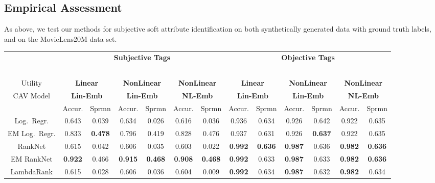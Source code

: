 \documentclass[manuscript,screen,nonacm]{acmart}
\newcommand{\1}{{\mathbf 1}}
\theoremstyle{TheoremNum}
\begin{document}
\subsection{Empirical Assessment}
\label{sec:empiricalSubjective}

As above, we test our methods for subjective soft attribute identification on both synthetically generated data with ground truth labels, and on the MovieLens20M data set.


\begin{table}[t]
  \centering
  {\footnotesize
  \begin{tabular}{|c||c|c|c|c|c|c||c|c|c|c|c|c|}
    \hline
     & \multicolumn{6}{c||}{\textbf{\normalsize Subjective Tags}} & \multicolumn{6}{c|}{\textbf{\normalsize Objective Tags}} \\
     & \multicolumn{6}{c||}{\, } & \multicolumn{6}{c|}{\, } \\
Utility     & \multicolumn{2}{c|}{\textbf{Linear}} & \multicolumn{2}{c|}{\textbf{NonLinear}} & \multicolumn{2}{c||}{\textbf{NonLinear}} & \multicolumn{2}{c|}{\textbf{Linear}} & \multicolumn{2}{c|}{\textbf{NonLinear}} & \multicolumn{2}{c|}{\textbf{NonLinear}}\\
CAV Model          & \multicolumn{2}{c|}{\textbf{Lin-Emb}} & \multicolumn{2}{c|}{\textbf{Lin-Emb}} & \multicolumn{2}{c||}{\textbf{NL-Emb}} & \multicolumn{2}{c|}{\textbf{Lin-Emb}} & \multicolumn{2}{c|}{\textbf{Lin-Emb}} & \multicolumn{2}{c|}{\textbf{NL-Emb}}\\
     &  Accur. &  Sprmn &  Accur. &  Sprmn &  Accur. &  Sprmn &  Accur. &  Sprmn &  Accur. &  Sprmn &  Accur. &  Sprmn \\ \hline\hline
 Log.\ Regr. & 0.643 & 0.039 & 0.634 & 0.026 & 0.616 & 0.036 & 0.936 & 0.634 & 0.926 & 0.642 & 0.922 & 0.635 \\ \hline
 EM Log.\ Regr. & 0.833 & \textbf{0.478} & 0.796 & 0.419 & 0.828 & 0.476 & 0.937 & 0.631 & 0.926 & \textbf{0.637} & 0.922 & 0.635 \\ \hline
 RankNet & 0.615 & 0.042 & 0.606 & 0.035 & 0.603 & 0.022 & \textbf{0.992} & \textbf{0.636} & \textbf{0.987} & 0.636 & \textbf{0.982} & \textbf{0.636} \\ \hline
 EM RankNet & \textbf{0.922} & 0.466 & \textbf{0.915} & \textbf{0.468} & \textbf{0.908} & \textbf{0.468} & \textbf{0.992} & 0.633 & \textbf{0.987} & 0.633 & \textbf{0.982} & \textbf{0.636} \\ \hline
  LambdaRank & 0.615 & 0.028 & 0.606 & 0.036 & 0.604 & 0.009 & \textbf{0.992} & 0.634 & \textbf{0.987} & 0.632 & \textbf{0.982} & 0.634 \\ \hline

\end{tabular}}
\end{table}
\end{document}
